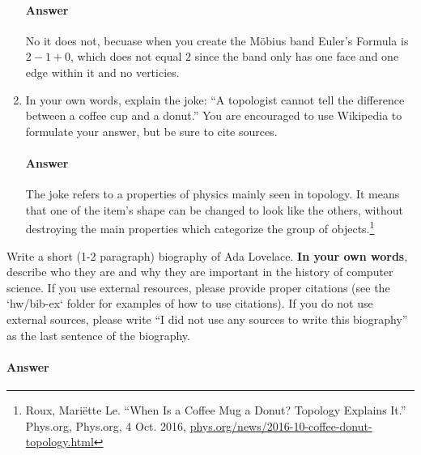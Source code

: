 \documentclass{article}
\begin{document}
\begin{enumerate}
        \paragraph{Answer}
       No it does not, becuase when you create the M\"obius band Euler's Formula is $2-1+0$, which does not equal $2$ since the band only has one face and one edge within it and no verticies.

    \item In your own words, explain the joke: ``A topologist cannot tell the
        difference between a coffee cup and a donut.''  You are encouraged to
        use Wikipedia to formulate your answer, but be sure to cite sources.

        \paragraph{Answer}
        The joke refers to a properties of physics mainly seen in topology. It means that one of the item's shape can be changed to look like the others, without destroying the main properties which categorize the group of objects.\footnote{Roux, Mariëtte Le. “When Is a Coffee Mug a Donut? Topology Explains It.” Phys.org, Phys.org, 4 Oct. 2016, \url{phys.org/news/2016-10-coffee-donut-topology.html}}
\end{enumerate}

\collab{\todo{}}

Write a short (1-2 paragraph) biography of Ada Lovelace.
\textbf{In your own words}, describe who they are and why they are important in
the history of computer science.  If you use external resources, please provide
proper citations (see the `hw/bib-ex` folder for examples of how to use
citations). If you do not use external sources, please write ``I did not
use any sources to write this biography'' as the last sentence of the
biography.

\paragraph{Answer}
\end{document}
